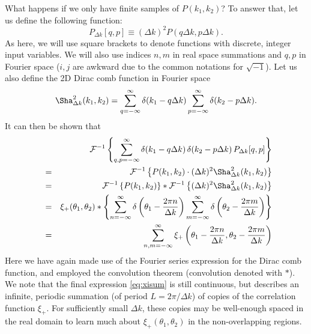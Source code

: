 \documentclass[preprint]{aastex}
\begin{document}
What happens if we only have finite samples of $P(k_1, k_2)$?  To
answer that, let us define the following function:
\begin{equation}
P_{\Delta k} [q, p] \equiv (\Delta k)^2 P(q \Delta k, p \Delta k).
\end{equation}
As here, we will use square brackets to denote functions with
discrete, integer input variables.  We will also use indices $n, m$ in
real space summations and $q, p$ in Fourier space ($i,j$ are awkward
due to the common notations for $\sqrt{-1}$).  Let us also define the 2D Dirac
comb function in Fourier space
\begin{equation}
\Sha^2_{\Delta k} (k_1, k_2) = \sum_{q = -\infty}^{\infty} \delta(k_1
- q \Delta k) \sum_{p = -\infty}^{\infty} \delta(k_2
- p \Delta k).
\end{equation}
It can then be shown that
\begin{eqnarray}
~ &~& \mathcal{F}^{-1} \left\{\sum_{q,p = -\infty}^{\infty} \delta(k_1
- q \Delta k) \, \delta(k_2
- p \Delta k) \, P_{\Delta k} [q, p] \right\} \nonumber \\
~ & = & \mathcal{F}^{-1} \left\{ P(k_1, k_2) \cdot  (\Delta
  k)^2 \Sha^2_{\Delta k} (k_1,
  k_2) \right\}  \nonumber  \\
 & = & \mathcal{F}^{-1} \left\{ P(k_1, k_2) \right\} * \mathcal{F}^{-1} \left\{  (\Delta
  k)^2 \Sha^2_{\Delta k} (k_1, k_2) \right\} \nonumber \\
 & = & \xi_+(\theta_1, \theta_2 )  * \left\{ \sum_{n = -\infty}^{\infty} \delta\left(\theta_1
- \frac{2 \pi n}{\Delta k} \right) \sum_{m = -\infty}^{\infty}
\delta\left( \theta_2
- \frac{2 \pi m}{\Delta k} \right)  \right\} \nonumber \\
& = & \sum_{n,m=-\infty}^{\infty} \xi_+\left(\theta_1
- \frac{2 \pi n}{\Delta k},  \theta_2
- \frac{2 \pi m}{\Delta k} \right) \label{eq:xisum}
\end{eqnarray}
Here we have again made use of the Fourier series expression for the
Dirac comb function, and employed the convolution theorem (convolution
denoted with $*$).  We note that the final expression \eqref{eq:xisum}
is still continuous, but describes an infinite, periodic summation (of period $L = 2 \pi
/ \Delta k$) of copies of the correlation function $\xi_+$.  For sufficiently small
$\Delta k$, these copies may be well-enough spaced in the real domain to
learn much about $\xi_+(\theta_1, \theta_2)$ in the non-overlapping
regions.
\end{document}
